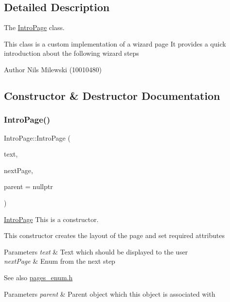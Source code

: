 \subsection{Detailed Description}
The \mbox{\hyperlink{class_intro_page}{Intro\+Page}} class. 

This class is a custom implementation of a wizard page It provides a quick introduction about the following wizard steps \begin{DoxyAuthor}{Author}
Nils Milewski (10010480) 
\end{DoxyAuthor}


\subsection{Constructor \& Destructor Documentation}
\mbox{\label{class_intro_page_ad984d57f77f15e89e82d1184c997b778}} 
\subsubsection{\texorpdfstring{Intro\+Page()}{IntroPage()}}
{\footnotesize\ttfamily Intro\+Page\+::\+Intro\+Page (\begin{DoxyParamCaption}\item[{Q\+String}]{text,  }\item[{pages\+\_\+enum}]{next\+Page,  }\item[{Q\+Widget $\ast$}]{parent = {\ttfamily nullptr} }\end{DoxyParamCaption})}



\mbox{\hyperlink{class_intro_page}{Intro\+Page}} This is a constructor. 

This constructor creates the layout of the page and set required attributes 
\begin{DoxyParams}{Parameters}
{\em text} & Text which should be displayed to the user \\
\hline
{\em next\+Page} & Enum from the next step \\
\hline
\end{DoxyParams}
\begin{DoxySeeAlso}{See also}
\mbox{\hyperlink{pages__enum_8h_source}{pages\+\_\+enum.\+h}} 
\end{DoxySeeAlso}

\begin{DoxyParams}{Parameters}
{\em parent} & Parent object which this object is associated with \\
\hline
\end{DoxyParams}


